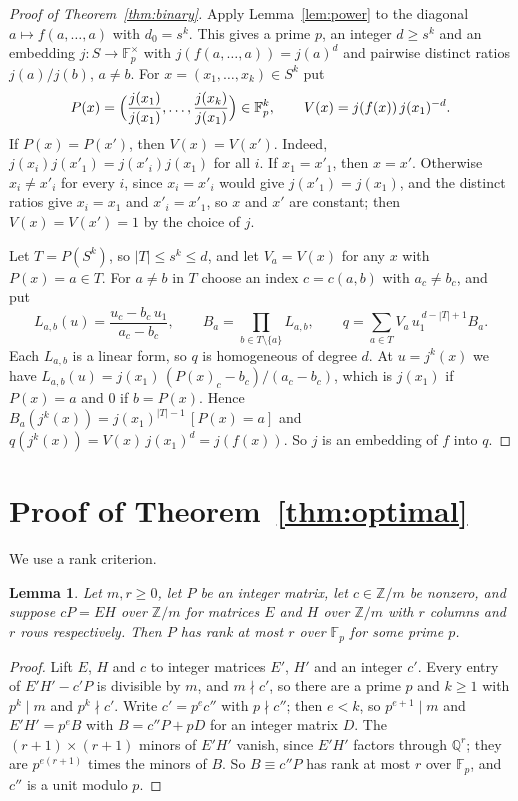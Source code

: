 \documentclass[11pt]{article}
\newtheorem{lemma}{Lemma}
\theoremstyle{definition}
\newcommand{\Z}{\mathbb{Z}}
\newcommand{\F}{\mathbb{F}}
\begin{document}
\begin{proof}[Proof of Theorem~\ref{thm:binary}]
Apply Lemma~\ref{lem:power} to the diagonal $a\mapsto f(a,\dots,a)$ with $d_0=s^k$. This gives a
prime $p$, an integer $d\ge s^k$ and an embedding $j\colon S\to\F_p^\times$ with
$j(f(a,\dots,a))=j(a)^d$ and pairwise distinct ratios $j(a)/j(b)$, $a\ne b$. For
$x=(x_1,\dots,x_k)\in S^k$ put
\[
  P(x)=\Bigl(\frac{j(x_1)}{j(x_1)},\dots,\frac{j(x_k)}{j(x_1)}\Bigr)\in\F_p^k,\qquad
  V(x)=j(f(x))\,j(x_1)^{-d}.
\]
If $P(x)=P(x')$, then $V(x)=V(x')$. Indeed, $j(x_i)j(x'_1)=j(x'_i)j(x_1)$ for all $i$. If
$x_1=x'_1$, then $x=x'$. Otherwise $x_i\ne x'_i$ for every $i$, since $x_i=x'_i$ would give $j(x'_1)=j(x_1)$, and the distinct ratios give
$x_i=x_1$ and $x'_i=x'_1$, so $x$ and $x'$ are constant; then $V(x)=V(x')=1$ by the choice of $j$.

Let $T=P(S^k)$, so $|T|\le s^k\le d$, and let $V_a=V(x)$ for any $x$ with $P(x)=a\in T$. For
$a\ne b$ in $T$ choose an index $c=c(a,b)$ with $a_c\ne b_c$, and put
\[
  L_{a,b}(u)=\frac{u_c-b_c\,u_1}{a_c-b_c},\qquad B_a=\prod_{b\in T\setminus\{a\}}L_{a,b},\qquad
  q=\sum_{a\in T}V_a\,u_1^{\,d-|T|+1}B_a .
\]
Each $L_{a,b}$ is a linear form, so $q$ is homogeneous of degree $d$. At $u=j^k(x)$ we have
$L_{a,b}(u)=j(x_1)\,(P(x)_c-b_c)/(a_c-b_c)$, which is $j(x_1)$ if $P(x)=a$ and $0$ if $b=P(x)$.
Hence $B_a(j^k(x))=j(x_1)^{|T|-1}\,[P(x)=a]$ and
$q(j^k(x))=V(x)\,j(x_1)^d=j(f(x))$. So $j$ is an embedding of $f$ into $q$.
\end{proof}

\section{Proof of Theorem~\ref{thm:optimal}}

We use a rank criterion.

\begin{lemma}\label{lem:lift}
Let $m,r\ge 0$, let $P$ be an integer matrix, let $c\in\Z/m$ be nonzero, and suppose $cP=EH$
over $\Z/m$ for matrices $E$ and $H$ over $\Z/m$ with $r$ columns and $r$ rows respectively. Then
$P$ has rank at most $r$ over $\F_p$ for some prime $p$.
\end{lemma}

\begin{proof}
Lift $E$, $H$ and $c$ to integer matrices $E'$, $H'$ and an integer $c'$. Every entry of
$E'H'-c'P$ is divisible by $m$, and $m\nmid c'$, so there are a prime $p$ and $k\ge 1$ with
$p^k\mid m$ and $p^k\nmid c'$. Write $c'=p^ec''$ with $p\nmid c''$; then $e<k$, so
$p^{e+1}\mid m$ and $E'H'=p^eB$ with $B=c''P+pD$ for an integer matrix $D$. The
$(r+1)\times(r+1)$ minors of $E'H'$ vanish, since $E'H'$ factors through $\mathbb{Q}^r$; they are
$p^{e(r+1)}$ times the minors of $B$. So $B\equiv c''P$ has rank at most $r$ over $\F_p$, and
$c''$ is a unit modulo $p$.
\end{proof}
\end{document}
